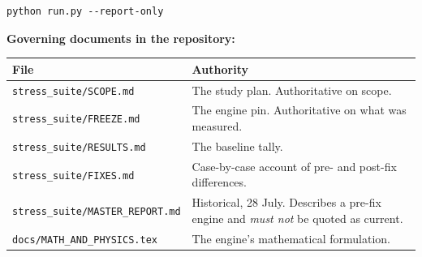 \documentclass[11pt,a4paper]{article}
\begin{document}
\begin{lstlisting}
python run.py --report-only
\end{lstlisting}

\medskip\noindent\textbf{Governing documents in the repository:}
\begin{center}
\begin{tabular}{@{}lL{0.52\textwidth}@{}}
\toprule
\textbf{File} & \textbf{Authority} \\
\midrule
\texttt{stress\_suite/SCOPE.md}   & The study plan. Authoritative on scope. \\
\texttt{stress\_suite/FREEZE.md}  & The engine pin. Authoritative on what was measured. \\
\texttt{stress\_suite/RESULTS.md} & The baseline tally. \\
\texttt{stress\_suite/FIXES.md}   & Case-by-case account of pre- and post-fix differences. \\
\texttt{stress\_suite/MASTER\_REPORT.md} & Historical, 28 July. Describes a pre-fix engine and \emph{must not} be quoted as current. \\
\texttt{docs/MATH\_AND\_PHYSICS.tex} & The engine's mathematical formulation. \\
\bottomrule
\end{tabular}
\end{center}
\end{document}
